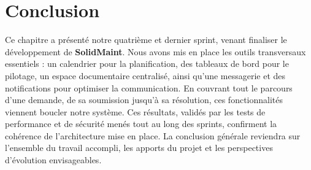 \section*{Conclusion}

Ce chapitre a présenté notre quatrième et dernier sprint, venant finaliser
le développement de \textbf{SolidMaint}. Nous avons mis en place les outils
transversaux essentiels : un calendrier pour la planification, des tableaux
de bord pour le pilotage, un espace documentaire centralisé, ainsi qu'une
messagerie et des notifications pour optimiser la communication.
\newline
En couvrant tout le parcours d'une demande, de sa soumission jusqu'à sa
résolution, ces fonctionnalités viennent boucler notre système. Ces
résultats, validés par les tests de performance et de sécurité menés tout
au long des sprints, confirment la cohérence de l'architecture mise en place.
\newline
La conclusion générale reviendra sur l'ensemble du travail accompli, les
apports du projet et les perspectives d'évolution envisageables.
